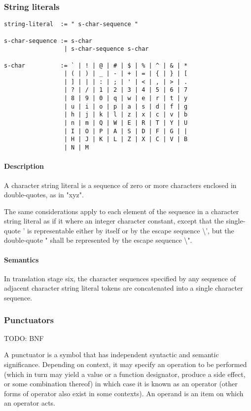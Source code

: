 \documentclass{article}
\begin{document}
\subsubsection{String literals}
\begin{lstlisting}[language=bnf]
string-literal  := " s-char-sequence "

s-char-sequence := s-char
                 | s-char-sequence s-char
                 
s-char          := ` | ! | @ | # | $ | % | ^ | & | *
                 | ( | ) | _ | - | + | = | { | } | [
                 | ] | | | : | ; | ' | < | , | > | .
                 | ? | / | 1 | 2 | 3 | 4 | 5 | 6 | 7
                 | 8 | 9 | 0 | q | w | e | r | t | y
                 | u | i | o | p | a | s | d | f | g
                 | h | j | k | l | z | x | c | v | b 
                 | n | m | Q | W | E | R | T | Y | U
                 | I | O | P | A | S | D | F | G | |
                 | H | J | K | L | Z | X | C | V | B
                 | N | M
\end{lstlisting}
\paragraph*{Description}
A character string literal is a sequence of zero or more characters enclosed in 
double-quotes, as in "xyz".
\linebreak

The same considerations apply to each element of the sequence in a character string
literal as if it where an integer character constant, except that the single-quote 
' is representable either by itself or by the escape sequence \textbackslash', but 
the double-quote " shall be represented by the escape sequence \textbackslash".

\paragraph*{Semantics}
In translation stage six, the character sequences specified by any sequence of adjacent 
character string literal tokens are concatenated into a single character sequence.

\subsubsection{Punctuators}
TODO: BNF

A punctuator is a symbol that has independent syntactic and semantic significance. 
Depending on context, it may specify an operation to be performed (which in turn 
may yield a value or a function designator, produce a side effect, or some combination 
thereof) in which case it is known as an operator (other forms of operator also exist 
in some contexts). An operand is an item on which an operator acts.
\linebreak
\end{document}
